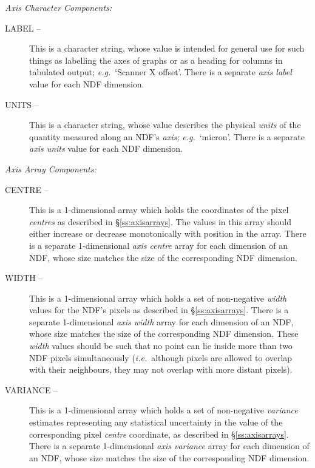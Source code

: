 \documentclass[twoside,11pt]{article}
\newcommand{\st}[1]{{\em{#1}}}
\begin{document}
{\large \st{Axis Character Components:}}\nopagebreak
\begin{description}

\item[LABEL --] This is a character string, whose value is intended for 
general use for such things as labelling the axes of graphs or as a heading 
for columns in tabulated output; \st{e.g.}\ `Scanner X offset'.
There is a separate \st{axis label\/} value for each NDF dimension.

\item[UNITS --] This is a character string, whose value describes the 
physical \st{units\/} of the quantity measured along an NDF's \st{axis;\/}
\st{e.g.}\ `micron'. 
There is a separate \st{axis units\/} value for each NDF dimension.

\end{description}

{\large \st{Axis Array Components:}}\nopagebreak
\begin{description}

\item[CENTRE --] This is a 1-dimensional array which holds the
coordinates of the pixel \st{centres\/} as described in
\S\ref{ss:axisarrays}. The values in this array should either increase
or decrease monotonically with position in the array. There is a
separate 1-dimensional \st{axis centre\/} array for each dimension of
an NDF, whose size matches the size of the corresponding NDF dimension. 

\item[WIDTH --] This is a 1-dimensional array which holds a set of
non-negative \st{width\/} values for the NDF's pixels as described in
\S\ref{ss:axisarrays}.  There is a separate 1-dimensional \st{axis
width\/} array for each dimension of an NDF, whose size matches the
size of the corresponding NDF dimension. These \st{width} values
should be such that no point can lie inside more than two NDF pixels
simultaneously (\st{i.e.}\ although pixels are allowed to overlap with
their neighbours, they may not overlap with more distant pixels).

\item[VARIANCE --] This is a 1-dimensional array which holds a set of
non-negative \st{variance\/} estimates representing any statistical
uncertainty in the value of the corresponding pixel \st{centre\/}
coordinate, as described in \S\ref{ss:axisarrays}.  There is a
separate 1-dimensional \st{axis variance\/} array for each dimension
of an NDF, whose size matches the size of the corresponding NDF
dimension.

\end{description}
\end{document}
